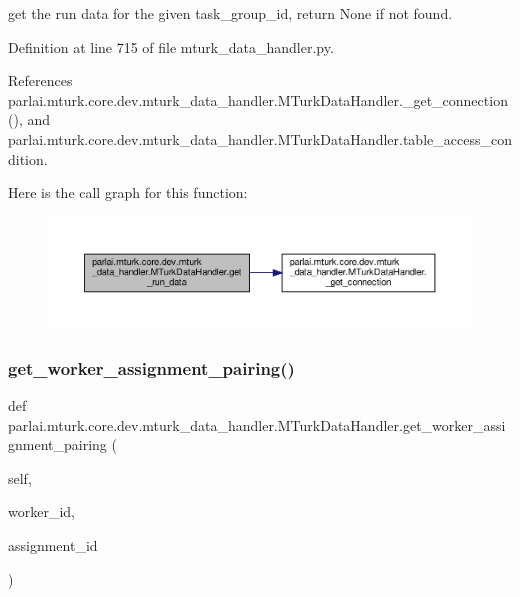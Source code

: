 \begin{DoxyVerb}get the run data for the given task_group_id, return None if not
found.
\end{DoxyVerb}
 

Definition at line 715 of file mturk\+\_\+data\+\_\+handler.\+py.



References parlai.\+mturk.\+core.\+dev.\+mturk\+\_\+data\+\_\+handler.\+M\+Turk\+Data\+Handler.\+\_\+get\+\_\+connection(), and parlai.\+mturk.\+core.\+dev.\+mturk\+\_\+data\+\_\+handler.\+M\+Turk\+Data\+Handler.\+table\+\_\+access\+\_\+condition.

Here is the call graph for this function\+:
\nopagebreak
\begin{figure}[H]
\begin{center}
\leavevmode
\includegraphics[width=350pt]{classparlai_1_1mturk_1_1core_1_1dev_1_1mturk__data__handler_1_1MTurkDataHandler_a915eb49ef703f1606b8039a76b6a9385_cgraph}
\end{center}
\end{figure}
\mbox{\label{classparlai_1_1mturk_1_1core_1_1dev_1_1mturk__data__handler_1_1MTurkDataHandler_a9aa7011c4fdd163ed18b99bbd697da78}} 
\subsubsection{\texorpdfstring{get\+\_\+worker\+\_\+assignment\+\_\+pairing()}{get\_worker\_assignment\_pairing()}}
{\footnotesize\ttfamily def parlai.\+mturk.\+core.\+dev.\+mturk\+\_\+data\+\_\+handler.\+M\+Turk\+Data\+Handler.\+get\+\_\+worker\+\_\+assignment\+\_\+pairing (\begin{DoxyParamCaption}\item[{}]{self,  }\item[{}]{worker\+\_\+id,  }\item[{}]{assignment\+\_\+id }\end{DoxyParamCaption})}

